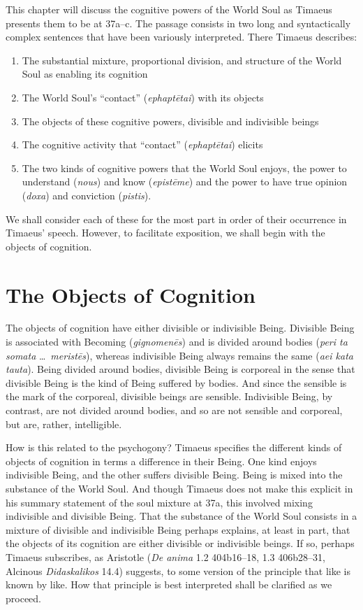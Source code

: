 This chapter will discuss the cognitive powers of the World Soul as Timaeus presents them to be at 37a--c. The passage consists in two long and syntactically complex sentences that have been variously interpreted. There Timaeus describes:
\begin{enumerate}[(1)]
	\item The substantial mixture, proportional division, and structure of the World Soul as enabling its cognition
	\item The World Soul's ``contact'' (\emph{ephaptētai}) with its objects
	\item The objects of these cognitive powers, divisible and indivisible beings
	\item The cognitive activity that ``contact'' (\emph{ephaptētai}) elicits
	\item The two kinds of cognitive powers that the World Soul enjoys, the power to understand (\emph{nous}) and know (\emph{epistēme}) and the power to have true opinion (\emph{doxa}) and conviction (\emph{pistis}).
\end{enumerate}
We shall consider each of these for the most part in order of their occurrence in Timaeus' speech. However, to facilitate exposition, we shall begin with the objects of cognition.


\section{The Objects of Cognition} %
\label{sec:the_objects_of_cognition}

The objects of cognition have either divisible or indivisible Being. Divisible Being is associated with Becoming (\emph{gignomenēs}) and is divided around bodies (\emph{peri ta somata} \ldots\ \emph{meristēs}), whereas indivisible Being always remains the same (\emph{aei kata tauta}). Being divided around bodies, divisible Being is corporeal in the sense that divisible Being is the kind of Being suffered by bodies. And since the sensible is the mark of the corporeal, divisible beings are sensible. Indivisible Being, by contrast, are not divided around bodies, and so are not sensible and corporeal, but are, rather, intelligible.

How is this related to the psychogony? Timaeus specifies the different kinds of objects of cognition in terms a difference in their Being. One kind enjoys indivisible Being, and the other suffers divisible Being. Being is mixed into the substance of the World Soul. And though Timaeus does not make this explicit in his summary statement of the soul mixture at 37a, this involved mixing indivisible and divisible Being. That the substance of the World Soul consists in a mixture of divisible and indivisible Being perhaps explains, at least in part, that the objects of its cognition are either divisible or indivisible beings. If so, perhaps Timaeus subscribes, as Aristotle (\emph{De anima} 1.2 404b16--18, 1.3 406b28--31, Alcinous \emph{Didaskalikos} 14.4) suggests, to some version of the principle that like is known by like. How that principle is best interpreted shall be clarified as we proceed.


